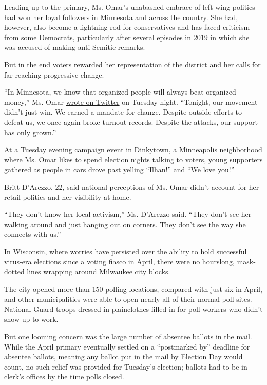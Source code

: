Leading up to the primary, Ms. Omar's unabashed embrace of left-wing
politics had won her loyal followers in Minnesota and across the
country. She had, however, also become a lightning rod for conservatives
and has faced criticism from some Democrats, particularly after several
episodes in 2019 in which she was accused of making anti-Semitic
remarks.

But in the end voters rewarded her representation of the district and
her calls for far-reaching progressive change.

``In Minnesota, we know that organized people will always beat organized
money,'' Ms. Omar
\href{https://twitter.com/IlhanMN/status/1293372617957740544?s=20}{wrote
on Twitter} on Tuesday night. ``Tonight, our movement didn't just win.
We earned a mandate for change. Despite outside efforts to defeat us, we
once again broke turnout records. Despite the attacks, our support has
only grown.''

At a Tuesday evening campaign event in Dinkytown, a Minneapolis
neighborhood where Ms. Omar likes to spend election nights talking to
voters, young supporters gathered as people in cars drove past yelling
``Ilhan!'' and ``We love you!''

Britt D'Arezzo, 22, said national perceptions of Ms. Omar didn't account
for her retail politics and her visibility at home.

``They don't know her local activism,'' Ms. D'Arezzo said. ``They don't
see her walking around and just hanging out on corners. They don't see
the way she connects with us.''

In Wisconsin, where worries have persisted over the ability to hold
successful virus-era elections since a voting fiasco in April, there
were no hourslong, mask-dotted lines wrapping around Milwaukee city
blocks.

The city opened more than 150 polling locations, compared with just six
in April, and other municipalities were able to open nearly all of their
normal poll sites. National Guard troops dressed in plainclothes filled
in for poll workers who didn't show up to work.

But one looming concern was the large number of absentee ballots in the
mail. While the April primary eventually settled on a ``postmarked by''
deadline for absentee ballots, meaning any ballot put in the mail by
Election Day would count, no such relief was provided for Tuesday's
election; ballots had to be in clerk's offices by the time polls closed.

